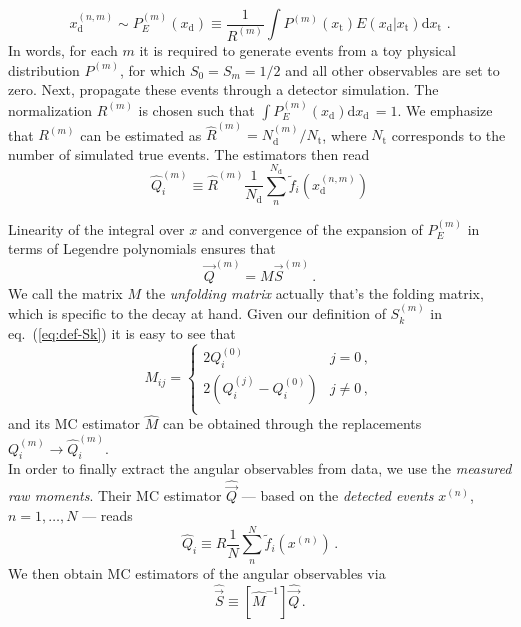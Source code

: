 \documentclass[aps,prd,reprint,nofootinbib,preprintnumbers]{revtex4}
\newcommand{\est}[1]{\widehat{#1}}
\newcommand{\refeq}[1]{eq.~(\ref{eq:#1})}
\newcommand{\rmdx}[1]{\mbox{d} #1 \,} %
\newcommand{\subd}{_{\text{d}}}
\newcommand{\subt}{_{\text{t}}}
\newcommand{\vecest}[1]{\widehat{\vec{#1}}}
\newcommand{\xd}{x\subd}
\newcommand{\xt}{x\subt}
\newcommand{\Ekernel}{E(\xd|\xt)}
\newcommand{\fred}[1]{{\color{brown!85!black}#1}}
\begin{document}
\begin{equation}
    x_\text{d}^{(n,m)} \sim P_E^{(m)}(\xd) \equiv \frac{1}{R^{(m)}} \int P^{(m)}(\xt) \Ekernel \rmdx{\xt}\,.
\end{equation}
In words, for each $m$ it is required to generate events from
a toy physical distribution $P^{(m)}$, for which $S_0 = S_m=1/2$ and all other
observables are set to zero. Next, propagate these events through
a detector simulation. The normalization $R^{(m)}$ is chosen such
that $\int P_E^{(m)}(\xd) \rmdx{\xd} = 1$.  We emphasize that
$R^{(m)}$ can be estimated as $\est{R}^{(m)} = N_\text{d}^{(m)} /
N_\text{t}$, where $N_\text{t}$ corresponds to the number of
simulated true events.  The estimators then read
\begin{equation}
    \est{Q}_i^{(m)} \equiv \est{R}^{(m)} \frac{1}{N_\text{d}} \sum_n^{N_\text{d}} \tilde{f}_i(x_\text{d}^{(n,m)})
\end{equation}

Linearity of the integral over $x$ and convergence of the expansion of
$P_E^{(m)}$ in terms of Legendre polynomials ensures that
\begin{equation}
    \vec{Q}^{(m)} = M \vec{S}^{(m)}\,.
\end{equation}
We call the matrix $M$ the \emph{unfolding matrix} \fred{actually that's the folding matrix}, which is
specific to the decay at hand.
Given our definition of $S_k^{(m)}$ in
\refeq{def-Sk} it is easy to see that
\begin{equation}
    M_{ij} = \begin{cases}
        2 Q_i^{(0)}                          & j = 0\,,\\
        2\left(Q_i^{(j)} - Q_i^{(0)}\right)  & j \neq 0\,,\\
    \end{cases}
\end{equation}
and its MC estimator $\est{M}$  can be obtained through the replacements $Q_i^{(m)} \to \est{Q}_i^{(m)}$.\\

In order to finally extract the angular observables from data, we use the \emph{measured raw moments}. Their MC estimator
$\vecest{Q}$ --- based on the \emph{detected events} $x^{(n)}$, $n=1,\dots,N$ --- reads
\begin{equation}
    \est{Q}_i \equiv R \frac{1}{N} \sum_n^N \tilde{f}_i(x^{(n)})\,.
\end{equation}
We then obtain MC estimators of the angular observables via
\begin{equation}
    \label{eq:estS}
    \vecest{S} \equiv \left[\est{M}^{-1}\right] \vecest{Q}\,.
\end{equation}
\end{document}

